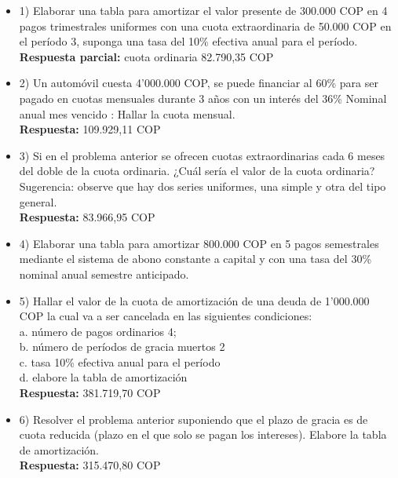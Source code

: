 \begin{itemize}
 \item 1)	Elaborar una tabla para amortizar el valor presente de 300.000 COP en 4 pagos trimestrales uniformes con una cuota extraordinaria de 50.000 COP en el período 3, suponga una tasa del 10\% efectiva anual para el período. \\
       \textbf{Respuesta parcial:} cuota ordinaria 82.790,35 COP
       \medskip

 \item 2)	Un automóvil cuesta 4'000.000 COP, se puede financiar al 60\% para ser pagado en cuotas mensuales durante 3 años con un interés del 36\%  Nominal anual mes vencido : Hallar la cuota mensual.\\
       \textbf{ Respuesta:} 109.929,11 COP
       \medskip

 \item 3)	Si en el problema anterior se ofrecen cuotas extraordinarias cada 6 meses del doble de la cuota ordinaria. ¿Cuál sería el valor de la cuota ordinaria?\\

       Sugerencia: observe que hay dos series uniformes, una simple y otra del tipo general.\\
       \textbf{Respuesta:} 83.966,95 COP
       \medskip

 \item 4)	Elaborar una tabla para amortizar 800.000 COP en 5 pagos semestrales mediante el sistema de abono constante a capital y con una tasa del 30\% nominal anual semestre anticipado.
       \medskip

 \item 5)	 Hallar el valor de la cuota de amortización de una deuda de 1'000.000 COP la cual va a ser cancelada en las siguientes condiciones:\\

       a.	número de pagos ordinarios 4;\\
       b.	número de períodos de gracia muertos 2\\
       c.	tasa 10\% efectiva anual para el período \\
       d.	elabore la tabla de amortización\\
       \textbf{ Respuesta:} 381.719,70 COP
       \medskip

 \item 6)	Resolver el problema anterior suponiendo que el plazo de gracia es de cuota reducida (plazo en el que solo se pagan los intereses). Elabore la tabla de amortización.\\
       \textbf{Respuesta:} 315.470,80 COP
       \medskip


\end{itemize}
